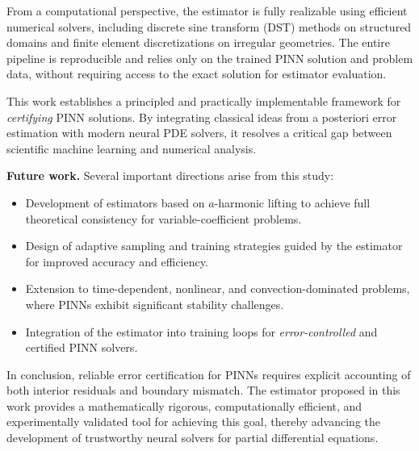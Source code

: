 From a computational perspective, the estimator is fully realizable using
efficient numerical solvers, including discrete sine transform (DST)
methods on structured domains and finite element discretizations on
irregular geometries. The entire pipeline is reproducible and relies only
on the trained PINN solution and problem data, without requiring access to
the exact solution for estimator evaluation.

This work establishes a principled and practically implementable framework
for \emph{certifying} PINN solutions. By integrating classical ideas from
a posteriori error estimation with modern neural PDE solvers, it resolves
a critical gap between scientific machine learning and numerical analysis.

\medskip

\noindent
\textbf{Future work.}
Several important directions arise from this study:
\begin{itemize}
\item Development of estimators based on $a$-harmonic lifting to achieve
full theoretical consistency for variable-coefficient problems.
\item Design of adaptive sampling and training strategies guided by the
estimator for improved accuracy and efficiency.
\item Extension to time-dependent, nonlinear, and convection-dominated
problems, where PINNs exhibit significant stability challenges.
\item Integration of the estimator into training loops for
\emph{error-controlled} and certified PINN solvers.
\end{itemize}

\medskip

\noindent
In conclusion, reliable error certification for PINNs requires explicit
accounting of both interior residuals and boundary mismatch. The estimator
proposed in this work provides a mathematically rigorous, computationally
efficient, and experimentally validated tool for achieving this goal,
thereby advancing the development of trustworthy neural solvers for
partial differential equations.